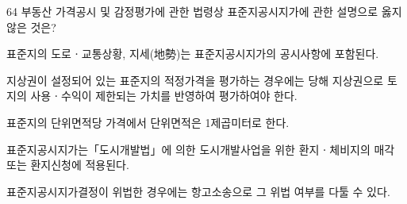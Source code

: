 \begin{question}{64}
부동산 가격공시 및 감정평가에 관한 법령상 표준지공시지가에 관한 설명으로 옳지 않은 것은?
\begin{choices}
  \item 표준지의 도로ㆍ교통상황, 지세(地勢)는 표준지공시지가의 공시사항에 포함된다.
  \item 지상권이 설정되어 있는 표준지의 적정가격을 평가하는 경우에는 당해 지상권으로 토지의 사용ㆍ수익이 제한되는 가치를 반영하여 평가하여야 한다.
  \item 표준지의 단위면적당 가격에서 단위면적은 1제곱미터로 한다.
  \item 표준지공시지가는「도시개발법」에 의한 도시개발사업을 위한 환지ㆍ체비지의 매각 또는 환지신청에 적용된다.
  \item 표준지공시지가결정이 위법한 경우에는 항고소송으로 그 위법 여부를 다툴 수 있다.
\end{choices}
\end{question}
